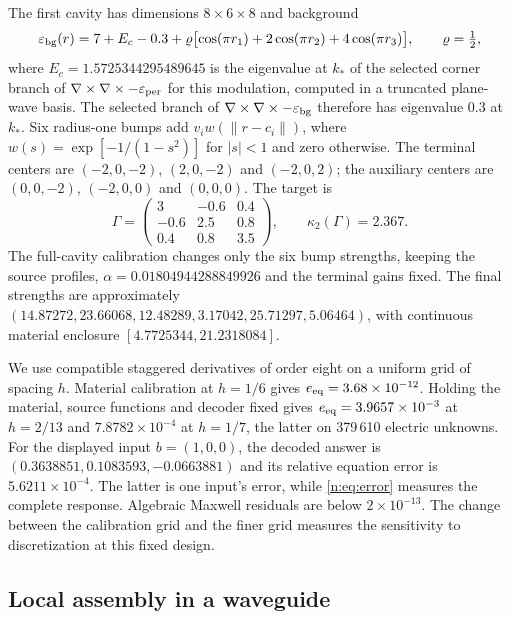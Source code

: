 The first cavity has dimensions $8\times6\times8$ and background
\begin{equation}
 \varepsilon_{\rm bg}(r)=7+E_c-0.3+
 \varrho\bigl[\cos(\pi r_1)+2\cos(\pi r_2)+4\cos(\pi r_3)\bigr],
 \qquad \varrho=\tfrac12,
 \label{n:eq:periodic-background}
\end{equation}
where $E_c=1.5725344295489645$ is the eigenvalue at $k_*$ of the selected
corner branch of ${\nabla\times\nabla\times-\varepsilon_{\rm per}}$ for this
modulation, computed in a truncated plane-wave basis. The selected branch
of ${\nabla\times\nabla\times-\varepsilon_{\rm bg}}$ therefore has eigenvalue
$0.3$ at $k_*$. Six radius-one bumps add
$v_i w(\lVert r-c_i\rVert)$, where
$w(s)=\exp[-1/(1-s^2)]$ for $|s|<1$ and zero otherwise. The terminal centers
are $(-2,0,-2)$, $(2,0,-2)$ and $(-2,0,2)$; the auxiliary centers are
$(0,0,-2)$, $(-2,0,0)$ and $(0,0,0)$. The target is
\begin{equation}
 \Gamma=\begin{pmatrix}3&-0.6&0.4\\-0.6&2.5&0.8\\0.4&0.8&3.5\end{pmatrix},
 \qquad \kappa_2(\Gamma)=2.367.
 \label{n:eq:periodic-target}
\end{equation}
The full-cavity calibration changes only the six bump strengths, keeping the
source profiles, $\alpha=0.01804944288849926$ and the terminal gains fixed.
The final strengths are approximately
$(14.87272,23.66068,12.48289,3.17042,25.71297,5.06464)$, with continuous
material enclosure $[4.7725344,21.2318084]$.

We use compatible staggered derivatives of order eight on a uniform grid of
spacing $h$. Material calibration
at $h=1/6$ gives $e_{\rm eq}=3.68\times10^{-12}$. Holding the material,
source functions and decoder fixed gives $e_{\rm eq}=3.9657\times10^{-3}$
at $h=2/13$ and $7.8782\times10^{-4}$ at $h=1/7$, the latter on
379\,610 electric unknowns. For the
displayed input $b=(1,0,0)$, the decoded answer is
$(0.3638851,0.1083593,-0.0663881)$ and its relative equation error is
$5.6211\times10^{-4}$. The latter is one input's error, while
\eqref{n:eq:error} measures the complete response. Algebraic Maxwell residuals
are below $2\times10^{-13}$. The change between the calibration grid and the
finer grid measures the sensitivity to discretization at this fixed design.

\subsection{Local assembly in a waveguide}

